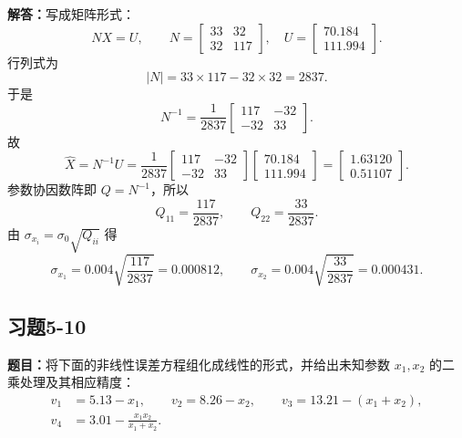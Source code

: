 \documentclass[UTF8,zihao=-4]{ctexart}
\newcommand{\problem}[1]{\subsection*{#1}}
\newcommand{\timu}{\noindent\textbf{题目：}}
\newcommand{\jieda}{\noindent\textbf{解答：}}
\begin{document}
{\jieda 写成矩阵形式：
\begin{equation*}
    N X=U,
    \qquad
    N=\begin{bmatrix}33&32\\32&117\end{bmatrix},
    \quad
    U=\begin{bmatrix}70.184\\111.994\end{bmatrix}.
\end{equation*}
行列式为
\begin{equation*}
    |N|=33\times117-32\times32=2837.
\end{equation*}
于是
\begin{equation*}
    N^{-1}=\frac{1}{2837}\begin{bmatrix}117&-32\\-32&33\end{bmatrix}.
\end{equation*}
故
\begin{equation*}
    \hat{X}=N^{-1}U
    =\frac{1}{2837}
    \begin{bmatrix}117&-32\\-32&33\end{bmatrix}
    \begin{bmatrix}70.184\\111.994\end{bmatrix}
    =\begin{bmatrix}1.63120\\0.51107\end{bmatrix}.
\end{equation*}
参数协因数阵即 $Q=N^{-1}$，所以
\begin{equation*}
    Q_{11}=\frac{117}{2837},\qquad Q_{22}=\frac{33}{2837}.
\end{equation*}
由 $\sigma_{x_i}=\sigma_0\sqrt{Q_{ii}}$ 得
\begin{equation*}
    \sigma_{x_1}=0.004\sqrt{\frac{117}{2837}}=0.000812,
    \qquad
    \sigma_{x_2}=0.004\sqrt{\frac{33}{2837}}=0.000431.
\end{equation*}

\problem{习题5-10}
\timu 将下面的非线性误差方程组化成线性的形式，并给出未知参数 $x_1,x_2$ 的二乘处理及其相应精度：
\begin{equation*}
\begin{aligned}
    v_1&=5.13-x_1,\qquad
    v_2=8.26-x_2,\qquad
    v_3=13.21-(x_1+x_2),\\
    v_4&=3.01-\frac{x_1x_2}{x_1+x_2}.
\end{aligned}
\end{equation*}

}
\end{document}
